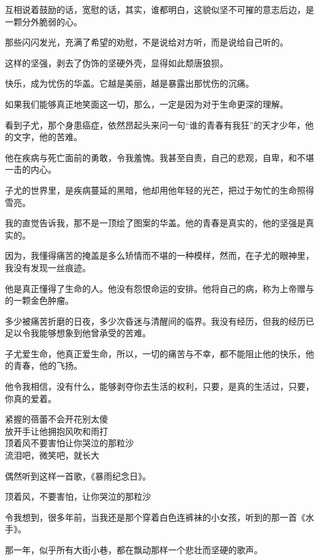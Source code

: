 \documentclass[12pt,a4paper]{article}
\begin{document}
		互相说着鼓励的话，宽慰的话，其实，谁都明白，这貌似坚不可摧的意志后边，是一颗分外脆弱的心。

		那些闪闪发光，充满了希望的劝慰，不是说给对方听，而是说给自己听的。

		这样的坚强，剥去了伪饰的坚硬外壳，显得如此颓唐狼狈。

		快乐，成为忧伤的华盖。它越是美丽，越是暴露出那忧伤的沉痛。

		如果我们能够真正地笑面这一切，那么，一定是因为对于生命更深的理解。

		看到子尤，那个身患癌症，依然昂起头来问一句“谁的青春有我狂”的天才少年，他的文字，他的苦难。

		他在疾病与死亡面前的勇敢，令我羞愧。我甚至自责，自己的悲观，自卑，和不堪一击的内心。

		子尤的世界里，是疾病蔓延的黑暗，他却用他年轻的光芒，把过于匆忙的生命照得雪亮。

		我的直觉告诉我，那不是一顶绘了图案的华盖。他的青春是真实的，他的坚强是真实的。

		因为，我懂得痛苦的掩盖是多么矫情而不堪的一种模样，然而，在子尤的眼神里，我没有发现一丝痕迹。

		他是真正懂得了生命的人。他没有怨恨命运的安排。他将自己的病，称为上帝赠与的一颗金色肿瘤。

		多少被痛苦折磨的日夜，多少次昏迷与清醒间的临界。我没有经历，但我的经历已足以令我能够想象到他曾承受的苦难。

		子尤爱生命，他真正爱生命，所以，一切的痛苦与不幸，都不能阻止他的快乐，他的青春，他的飞扬。

		他令我相信，没有什么，能够剥夺你去生活的权利，只要，是真的生活过，只要，你真的爱着。

	\endwriting



		\longpoem{}{}{}
		紧握的蓓蕾不会开花别太傻 \\
		放开手让他拥抱风吹和雨打 \\
		顶着风不要害怕让你哭泣的那粒沙 \\
		流泪吧，微笑吧，就长大
		\endlongpoem

		偶然听到这样一首歌，《暴雨纪念日》。

		\longpoem{}{}{}
			顶着风，不要害怕，让你哭泣的那粒沙
		\endlongpoem

		令我想到，很多年前，当我还是那个穿着白色连裤袜的小女孩，听到的那一首《水手》。

		那一年，似乎所有大街小巷，都在飘动那样一个悲壮而坚硬的歌声。
\end{document}

